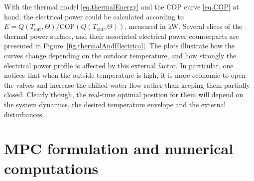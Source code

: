 With the thermal model \eqref{eq.thermalEnergy} and the COP curve \eqref{eq.COP} at hand, the electrical power could be calculated according to $E = Q(T_\text{out},\Theta)/\text{COP}(Q(T_\text{out},\Theta))$, measured in kW. Several slices of the thermal power surface, and their associated electrical power counterparts are presented in Figure~\ref{fig.thermalAndElectrical}. The plots illustrate how the curves change depending on the outdoor temperature, and how strongly the electrical power profile is affected by this external factor. In particular, one notices that when the outside temperature is high, it is more economic to open the valves and increase the chilled water flow rather than keeping them partially closed. Clearly though, the real-time optimal position for them will depend on the system dynamics, the desired temperature envelope and the external disturbances.

\section{MPC formulation and numerical computations}

